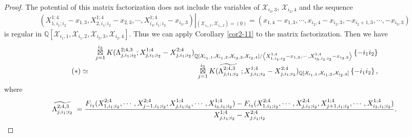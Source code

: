 \documentclass[10pt]{amsart}
\theoremstyle{break}
\begin{document}
\begin{proof}
The potential of this matrix factorization does not include the variables of $\mathcal{X}_{i_3,3}$, $\mathcal{X}_{i_2,4}$ and the sequence 
\begin{equation*}
(X_{1,i_1;i_2}^{1;4}-x_{1,3},X_{2,i_1;i_2}^{1;4}-x_{2,3},\cdots ,X_{i_3,i_1;i_2}^{1;4}-x_{i_3,3})\left|_{(\mathcal{X}_{i_1,1},\mathcal{X}_{i_1,2})=
(\underline{0})}\right. 
=(x_{1,4}-x_{1,3},\cdots,x_{i_2,4}-x_{i_2,3},-x_{i_2+1,3},\cdots,-x_{i_3,3})
\end{equation*}
is regular in ${{\mathbb{Q}}}[\mathcal{X}_{i_{1},1},\mathcal{X}_{i_{1},2},\mathcal{X}_{i_{3},3},\mathcal{X}_{i_{2},4}]$. Thus we can apply Corollary \ref{cor2-11} 
to the matrix factorization. Then we have
\begin{eqnarray*}
&&\mathop{\boxtimes}_{j=1}^{i_3}K(\Lambda_{j,i_1;i_2}^{2;4,3};X_{j,i_1;i_2}^{1;4}-X_{j,i_1;i_2}^{2;4})_{{{\mathbb{Q}}} [\mathcal{X}_{i_{1},1},\mathcal{X}_{i_{1},2},\mathcal{X}_{i_{3},3},\mathcal{X}_{i_{2},4}]/\left< X_{1,i_1;i_2}^{1;4}-x_{1,3} ,\cdots ,X_{i_3,i_1;i_2}^{1;4}-x_{i_3,3} \right> }\left\{ -i_1 i_2 \right\}\\[-0.1em]
(\ast)&\simeq&\mathop{\boxtimes}_{j=1}^{i_3}K(\widetilde{\Lambda_{j,i_1;i_2}^{2;4,3}}\hspace{1mm};X_{j,i_1;i_2}^{1;4}-X_{j,i_1;i_2}^{2;4})_{{{\mathbb{Q}}} [\mathcal{X}_{i_{1},1},\mathcal{X}_{i_{1},2},\mathcal{X}_{i_{2},4}]}\left\{ -i_1 i_2 \right\} ,
\end{eqnarray*}
where 
\begin{equation*}
\widetilde{\Lambda_{j,i_1;i_2}^{2;4,3}}\hspace{1mm}=
\frac{F_{i_3}(X_{1,i_1;i_2}^{2;4},\cdots ,X_{j-1,i_1;i_2}^{2;4},X_{j,i_1;i_2}^{1;4},\cdots ,X_{i_3,i_1;i_2}^{1;4})-
F_{i_3}(X_{1,i_1;i_2}^{2;4},\cdots ,X_{j,i_1;i_2}^{2;4},X_{j+1,i_1;i_2}^{1;4},\cdots ,X_{i_3,i_1;i_2}^{1;4})}{X_{j,i_1;i_2}^{1;4}-X_{j,i_1;i_2}^{2;4}}.
\end{equation*}


\end{proof}
\end{document}
